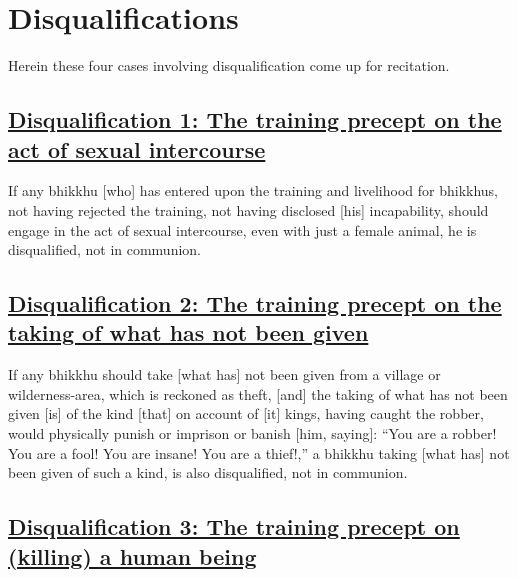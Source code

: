 
\section{Disqualifications}
\label{disqualifications}

\begin{intro}
	Herein these four cases involving disqualification come up for recitation.
\end{intro}

\setsubsecheadstyle{\subsubsectionFmtalt}
\subsection*{\hyperref[par1]{Disqualification 1: The training precept on the act of sexual intercourse}}
\label{disq1}

If any bhikkhu [who] has entered upon the training and livelihood for bhikkhus, not having rejected the training, not having disclosed [his] incapability, should engage in the act of sexual intercourse, even with just a female animal, he is disqualified, not in communion.



\subsection*{\hyperref[par2]{Disqualification 2: The training precept on the taking of what has not been given}}
\label{disq2}

If any bhikkhu should take [what has] not been given from a village or wilderness-area, which is reckoned as theft, [and] the taking of what has not been given [is] of the kind [that] on account of [it] kings, having caught the robber, would physically punish or imprison or banish [him, saying]: ``You are a robber! You are a fool! You are insane! You are a thief!,'' a bhikkhu taking [what has] not been given of such a kind, is also disqualified, not in communion.



\subsection*{\hyperref[par3]{Disqualification 3: The training precept on (killing) a human being}}
\label{disq3}

